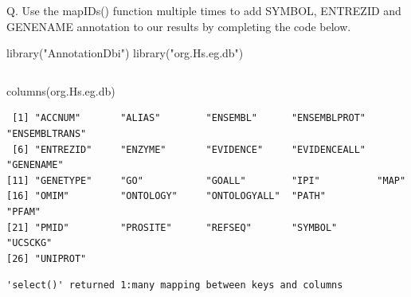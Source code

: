 \documentclass[
  letterpaper,
  DIV=11,
  numbers=noendperiod]{scrartcl}
\newenvironment{Shaded}{\begin{snugshade}}{\end{snugshade}}
\newcommand{\AttributeTok}[1]{\textcolor[rgb]{0.40,0.45,0.13}{#1}}
\newcommand{\FunctionTok}[1]{\textcolor[rgb]{0.28,0.35,0.67}{#1}}
\newcommand{\NormalTok}[1]{\textcolor[rgb]{0.00,0.23,0.31}{#1}}
\newcommand{\OtherTok}[1]{\textcolor[rgb]{0.00,0.23,0.31}{#1}}
\newcommand{\SpecialCharTok}[1]{\textcolor[rgb]{0.37,0.37,0.37}{#1}}
\newcommand{\StringTok}[1]{\textcolor[rgb]{0.13,0.47,0.30}{#1}}
\begin{document}
Q. Use the mapIDs() function multiple times to add SYMBOL, ENTREZID and
GENENAME annotation to our results by completing the code below.

\begin{Shaded}
\begin{Highlighting}[]
\FunctionTok{library}\NormalTok{(}\StringTok{"AnnotationDbi"}\NormalTok{)}
\FunctionTok{library}\NormalTok{(}\StringTok{"org.Hs.eg.db"}\NormalTok{)}
\end{Highlighting}
\end{Shaded}

\begin{verbatim}
\end{verbatim}

\begin{Shaded}
\begin{Highlighting}[]
\FunctionTok{columns}\NormalTok{(org.Hs.eg.db)}
\end{Highlighting}
\end{Shaded}

\begin{verbatim}
 [1] "ACCNUM"       "ALIAS"        "ENSEMBL"      "ENSEMBLPROT"  "ENSEMBLTRANS"
 [6] "ENTREZID"     "ENZYME"       "EVIDENCE"     "EVIDENCEALL"  "GENENAME"    
[11] "GENETYPE"     "GO"           "GOALL"        "IPI"          "MAP"         
[16] "OMIM"         "ONTOLOGY"     "ONTOLOGYALL"  "PATH"         "PFAM"        
[21] "PMID"         "PROSITE"      "REFSEQ"       "SYMBOL"       "UCSCKG"      
[26] "UNIPROT"     
\end{verbatim}

\begin{Shaded}
\end{Shaded}

\begin{verbatim}
'select()' returned 1:many mapping between keys and columns
\end{verbatim}

\begin{Shaded}
\end{Shaded}
\end{document}
